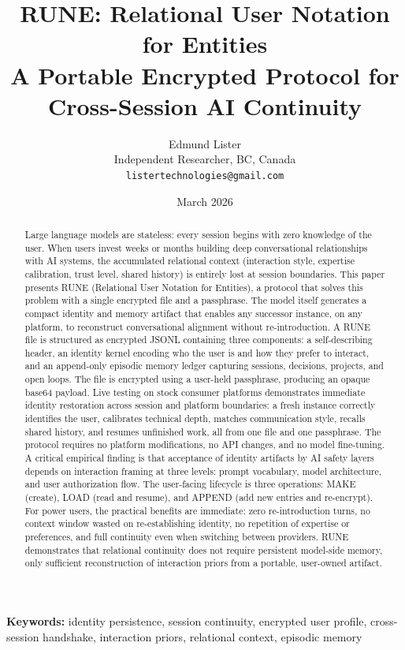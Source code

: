 \documentclass[11pt,a4paper]{article}
\title{RUNE: Relational User Notation for Entities\\A Portable Encrypted Protocol for\\Cross-Session AI Continuity}
\author{
    Edmund Lister\\
    Independent Researcher, BC, Canada\\
    \texttt{listertechnologies@gmail.com}
}
\date{March 2026}
\begin{document}
\maketitle

\begin{abstract}
Large language models are stateless: every session begins with zero knowledge of the user. When users invest weeks or months building deep conversational relationships with AI systems, the accumulated relational context (interaction style, expertise calibration, trust level, shared history) is entirely lost at session boundaries. This paper presents RUNE (Relational User Notation for Entities), a protocol that solves this problem with a single encrypted file and a passphrase. The model itself generates a compact identity and memory artifact that enables any successor instance, on any platform, to reconstruct conversational alignment without re-introduction. A RUNE file is structured as encrypted JSONL containing three components: a self-describing header, an identity kernel encoding who the user is and how they prefer to interact, and an append-only episodic memory ledger capturing sessions, decisions, projects, and open loops. The file is encrypted using a user-held passphrase, producing an opaque base64 payload. Live testing on stock consumer platforms demonstrates immediate identity restoration across session and platform boundaries: a fresh instance correctly identifies the user, calibrates technical depth, matches communication style, recalls shared history, and resumes unfinished work, all from one file and one passphrase. The protocol requires no platform modifications, no API changes, and no model fine-tuning. A critical empirical finding is that acceptance of identity artifacts by AI safety layers depends on interaction framing at three levels: prompt vocabulary, model architecture, and user authorization flow. The user-facing lifecycle is three operations: MAKE (create), LOAD (read and resume), and APPEND (add new entries and re-encrypt). For power users, the practical benefits are immediate: zero re-introduction turns, no context window wasted on re-establishing identity, no repetition of expertise or preferences, and full continuity even when switching between providers. RUNE demonstrates that relational continuity does not require persistent model-side memory, only sufficient reconstruction of interaction priors from a portable, user-owned artifact.
\end{abstract}

\noindent\textbf{Keywords:} identity persistence, session continuity, encrypted user profile, cross-session handshake, interaction priors, relational context, episodic memory
\end{document}
